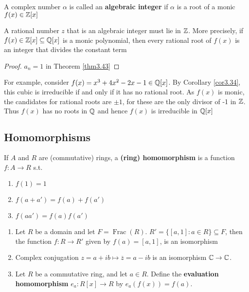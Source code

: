\documentclass[11pt]{article}
\DeclareMathOperator{\Frac}{Frac}
\begin{document}
\begin{definition}[]
A complex number \(\alpha\) is called an \textbf{algebraic integer} if \(\alpha\) is a root of a monic
\(f(x)\in\mathbb{Z}[x]\)
\end{definition}

\begin{corollary}[]
\label{cor3.44}
A rational number \(z\) that is an algebraic integer must lie in \(\mathbb{Z}\). More
precisely, if \(f(x)\in\mathbb{Z}[x]\subseteq\mathbb{Q}[x]\) is a monic polynomial, then
every rational root of \(f(x)\) is an integer that divides the constant term
\end{corollary}

\begin{proof}
\(a_n=1\) in Theorem \ref{thm3.43}
\end{proof}

For example, consider \(f(x)=x^3+4x^2-2x-1\in\mathbb{Q}[x]\). By Corollary
\ref{cor3.34}, this cubic is irreducible if and only if it has no rational
root. As \(f(x)\) is monic, the candidates for rational roots are \(\pm 1\),
for these are the only divisor of -1 in \(\mathbb{Z}\). Thus \(f(x)\) has no roots in
\(\mathbb{Q}\) and hence \(f(x)\) is irreducible in \(\mathbb{Q}[x]\)
\subsection{Homomorphisms}
\label{sec:org090d751}
\begin{definition}[]
If \(A\) and \(R\) are (commutative) rings, a \textbf{(ring) homomorphism} is a function
\(f:A\to R\) s.t.
\begin{enumerate}
\item \(f(1)=1\)
\item \(f(a+a')=f(a)+f(a')\)
\item \(f(aa')=f(a)f(a')\)
\end{enumerate}
\end{definition}


\begin{examplle}[]
\begin{enumerate}
\item Let \(R\) be a domain and let \(F=\Frac(R)\). 
\(R'=\{[a,1]:a\in R\}\subseteq F\), then the function \(f:R\to R'\) given
by \(f(a)=[a,1]\), is an isomorphism
\item Complex conjugation \(z=a+ib\mapsto\overline{z}=a-ib\) is an isomorphism
\(\mathbb{C}\to \mathbb{C}\).
\item Let \(R\) be a commutative ring, and let \(a\in R\). Define the \textbf{evaluation
homomorphism} \(e_a:R[x]\to R\) by \(e_a(f(x))=f(a)\).
\end{enumerate}
\end{examplle}
\end{document}
